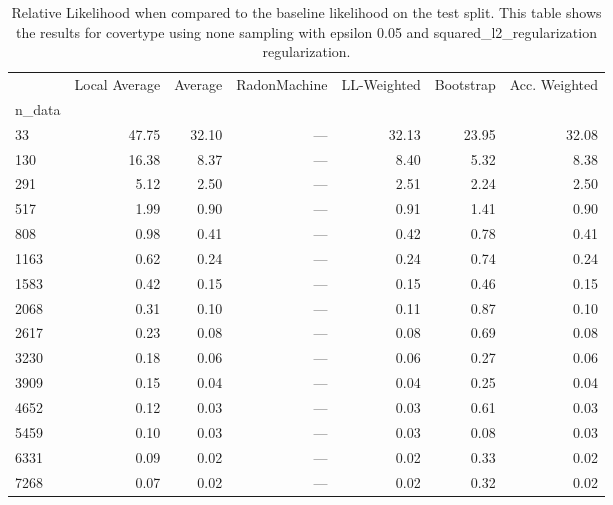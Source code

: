 \begin{table}
\centering
\caption{Relative Likelihood when compared to the baseline likelihood on the test split. This table shows the results for  covertype using  none sampling with epsilon  0.05 and  squared_l2_regularization regularization.}
\label{tab:6}
\begin{tabular}{lrrrrrr}
\toprule
{} &  Local Average &  Average &  RadonMachine &  LL-Weighted &  Bootstrap &  Acc. Weighted \\
n\_data &                &          &               &              &            &                \\
\midrule
33     &          47.75 &    32.10 &           --- &        32.13 &      23.95 &          32.08 \\
130    &          16.38 &     8.37 &           --- &         8.40 &       5.32 &           8.38 \\
291    &           5.12 &     2.50 &           --- &         2.51 &       2.24 &           2.50 \\
517    &           1.99 &     0.90 &           --- &         0.91 &       1.41 &           0.90 \\
808    &           0.98 &     0.41 &           --- &         0.42 &       0.78 &           0.41 \\
1163   &           0.62 &     0.24 &           --- &         0.24 &       0.74 &           0.24 \\
1583   &           0.42 &     0.15 &           --- &         0.15 &       0.46 &           0.15 \\
2068   &           0.31 &     0.10 &           --- &         0.11 &       0.87 &           0.10 \\
2617   &           0.23 &     0.08 &           --- &         0.08 &       0.69 &           0.08 \\
3230   &           0.18 &     0.06 &           --- &         0.06 &       0.27 &           0.06 \\
3909   &           0.15 &     0.04 &           --- &         0.04 &       0.25 &           0.04 \\
4652   &           0.12 &     0.03 &           --- &         0.03 &       0.61 &           0.03 \\
5459   &           0.10 &     0.03 &           --- &         0.03 &       0.08 &           0.03 \\
6331   &           0.09 &     0.02 &           --- &         0.02 &       0.33 &           0.02 \\
7268   &           0.07 &     0.02 &           --- &         0.02 &       0.32 &           0.02 \\
\bottomrule
\end{tabular}
\end{table}

